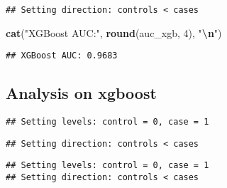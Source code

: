 \documentclass[
]{article}
\newenvironment{Shaded}{\begin{snugshade}}{\end{snugshade}}
\newcommand{\CommentTok}[1]{\textcolor[rgb]{0.56,0.35,0.01}{\textit{#1}}}
\newcommand{\DecValTok}[1]{\textcolor[rgb]{0.00,0.00,0.81}{#1}}
\newcommand{\FunctionTok}[1]{\textcolor[rgb]{0.13,0.29,0.53}{\textbf{#1}}}
\newcommand{\NormalTok}[1]{#1}
\newcommand{\OtherTok}[1]{\textcolor[rgb]{0.56,0.35,0.01}{#1}}
\newcommand{\SpecialCharTok}[1]{\textcolor[rgb]{0.81,0.36,0.00}{\textbf{#1}}}
\newcommand{\StringTok}[1]{\textcolor[rgb]{0.31,0.60,0.02}{#1}}
\begin{document}
\begin{verbatim}
## Setting direction: controls < cases
\end{verbatim}

\begin{Shaded}
\begin{Highlighting}[]
\FunctionTok{cat}\NormalTok{(}\StringTok{"XGBoost AUC:"}\NormalTok{, }\FunctionTok{round}\NormalTok{(auc\_xgb, }\DecValTok{4}\NormalTok{), }\StringTok{"}\SpecialCharTok{\textbackslash{}n}\StringTok{"}\NormalTok{)}
\end{Highlighting}
\end{Shaded}

\begin{verbatim}
## XGBoost AUC: 0.9683
\end{verbatim}

\subsection{Analysis on xgboost}\label{analysis-on-xgboost}

\begin{Shaded}
\end{Shaded}

\begin{verbatim}
## Setting levels: control = 0, case = 1
\end{verbatim}

\begin{verbatim}
## Setting direction: controls < cases
\end{verbatim}

\begin{Shaded}
\end{Shaded}

\begin{verbatim}
## Setting levels: control = 0, case = 1
## Setting direction: controls < cases
\end{verbatim}
\end{document}
